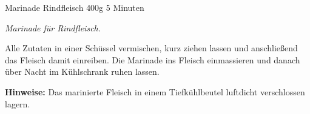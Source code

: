 \begin{recipe}{Marinade Rindfleisch} {400g} {5 Minuten}

  \freeform
  \textit{Marinade für Rindfleisch.}


  Alle Zutaten in einer Schüssel vermischen, kurz ziehen lassen und anschließend das Fleisch damit einreiben.
  Die Marinade ins Fleisch einmassieren und danach über Nacht im Kühlschrank ruhen lassen.

  \freeform
  \hrulefill

  \freeform
  \textbf{Hinweise:}
  Das marinierte Fleisch in einem Tiefkühlbeutel luftdicht verschlossen lagern.

\end{recipe}
